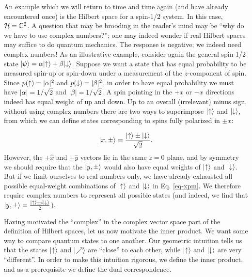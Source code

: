 An example which we will return to time and time again (and have already encountered once) is the Hilbert space for a spin-1/2 system. In this case, $\mathcal{H} = \mathbb{C}^2$. A question that may be brooding in the reader's mind may be ``why do we have to use complex numbers?''; one may indeed wonder if real Hilbert spaces may suffice to do quantum mechanics. The response is negative; we indeed need complex numbers! As an illustrative example, consider again the general spin-1/2 state $\lvert \psi \rangle = \alpha\lvert \uparrow \rangle + \beta\lvert \downarrow \rangle$. Suppose we want a state that has equal probability to be measured spin-up or spin-down under a measurement of the $z$-component of spin. Since $p(\uparrow) = \lvert \alpha \rvert^2$ and $p(\downarrow) = \lvert \beta \rvert^2$, in order to have equal probability we must have $\lvert \alpha \rvert = 1/\sqrt{2}$ and $\lvert \beta \rvert = 1/\sqrt{2}$. A spin pointing in the $+x$ or $-x$ directions indeed has equal weight of up and down. Up to an overall (irrelevant) minus sign, without using complex numbers there are two ways to superimpose $\lvert \uparrow \rangle$ and $\lvert \downarrow \rangle$, from which we can define states corresponding to spins fully polarized in $\pm x$:

\begin{equation}\label{eq-xpm}
    \lvert x, \pm \rangle = \frac{\lvert \uparrow \rangle \pm \lvert \downarrow \rangle}{\sqrt{2}}.
\end{equation}
However, the $\pm \hat{x}$ and $\pm \hat{y}$ vectors lie in the same $z = 0$ plane, and by symmetry we should require that the $\lvert y, \pm \rangle$ would also have equal weights of $\lvert \uparrow \rangle$ and $\lvert \downarrow \rangle$. But if we limit ourselves to real numbers only, we have already exhausted all possible equal-weight combinations of $\lvert \uparrow \rangle$ and $\lvert \downarrow \rangle$ in Eq. \eqref{eq-xpm}. We therefore require complex  numbers to represent all possible states (and indeed, we find that $\lvert y, \pm \rangle = \frac{\lvert \uparrow \rangle \pm i \lvert \downarrow \rangle}{2}$).

Having motivated the ``complex'' in the complex vector space part of the definition of Hilbert spaces, let us now motivate the inner product. We want some way to compare quantum states to one another. Our geometric intuition tells us that the states $\lvert \uparrow \rangle$ and $\lvert \nearrow \rangle$ are ``close'' to each other, while $\lvert \uparrow \rangle$ and $\lvert \downarrow \rangle$ are very ``different''. In order to make this intuition rigorous, we define the inner product, and as a prerequisite we define the dual correspondence.

